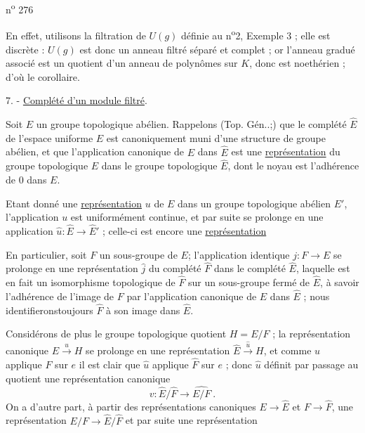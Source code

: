 n\textsuperscript{o} 276

En effet, utilisons la filtration de $U(g)$ définie au n\textsuperscript{o}2, Exemple 3 ; elle est discrète : $U(g)$ est donc un anneau filtré séparé et complet ; or l'anneau gradué associé est un quotient d'un anneau de polynômes sur $K$, donc est noethérien ; d'où le corollaire.

7. - \uline{Complété d'un module filtré}.

Soit $E$ un groupe topologique abélien. Rappelons (Top. Gén..;) que le complété $\hat E$ de l'espace uniforme $E$ est canoniquement muni d'une structure de groupe abélien, et que l'application canonique de $E$ dans $\hat E$ est une \uline{représentation} du groupe topologique $E$ dans le groupe topologique $\hat E$, dont le noyau est l'adhérence de $0$ dans $E$.

Etant donné une \uline{représentation} $u$ de $E$ dans un groupe topologique abélien $E'$, l'application $u$ est uniformément continue, et par suite se prolonge en une application $\hat u:\hat E\longrightarrow\hat E'$ ; celle-ci est encore une \uline{représentation}

En particulier, soit $F$ un sous-groupe de $E$; l'application identique $j:F\longrightarrow E$ se prolonge en une représentation $\hat j$ du complété $\hat F$ dans le complété $\hat E$, laquelle est en fait un isomorphisme topologique de $\hat F$ sur un sous-groupe fermé de $\hat E$, à savoir l'adhérence de l'image de $F$ par l'application canonique de $E$ dans $\hat E$ ; nous identifierons\handwritten{\textbar}toujours $\hat F$ à son image dans $\hat E$.

Considérons de plus le groupe topologique quotient $H=E/F$ ; la représentation canonique $E\xrightarrow{u}H$ se prolonge en une représentation $\hat E\xrightarrow{\hat u}H$, et comme $u$ applique $F$ sur $e$ il est clair que $\hat u$ applique $\hat F$ sur $e$ ; donc $\hat u$ définit par passage au quotient une représentation canonique
\[
v:\hat E/\hat F\longrightarrow\widehat{E/F}\ .
\]
On a d'autre part, à partir des représentations canoniques $E\longrightarrow\hat E$ et $F\longrightarrow\hat F$, une représentation $E/F\longrightarrow\hat E/\hat F$ et par suite une représentation

